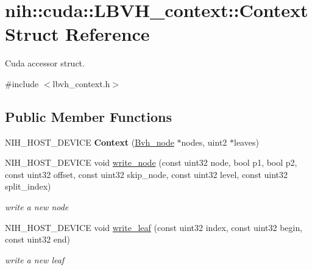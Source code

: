 \hypertarget{structnih_1_1cuda_1_1_l_b_v_h__context_1_1_context}{
\section{nih\-:\-:cuda\-:\-:\-L\-B\-V\-H\-\_\-context\-:\-:\-Context \-Struct \-Reference}
\label{structnih_1_1cuda_1_1_l_b_v_h__context_1_1_context}
}


\-Cuda accessor struct.  




{\ttfamily \#include $<$lbvh\-\_\-context.\-h$>$}

\subsection*{\-Public \-Member \-Functions}
\begin{DoxyCompactItemize}
\item 
\hypertarget{structnih_1_1cuda_1_1_l_b_v_h__context_1_1_context_a48c48237aa069100299b8b8f6d3e351e}{
\-N\-I\-H\-\_\-\-H\-O\-S\-T\-\_\-\-D\-E\-V\-I\-C\-E {\bfseries \-Context} (\hyperlink{structnih_1_1_bvh__node}{\-Bvh\-\_\-node} $\ast$nodes, uint2 $\ast$leaves)}
\label{structnih_1_1cuda_1_1_l_b_v_h__context_1_1_context_a48c48237aa069100299b8b8f6d3e351e}

\item 
\hypertarget{structnih_1_1cuda_1_1_l_b_v_h__context_1_1_context_acad326a954f197df7feba006a62d5c4c}{
\-N\-I\-H\-\_\-\-H\-O\-S\-T\-\_\-\-D\-E\-V\-I\-C\-E void \hyperlink{structnih_1_1cuda_1_1_l_b_v_h__context_1_1_context_acad326a954f197df7feba006a62d5c4c}{write\-\_\-node} (const uint32 node, bool p1, bool p2, const uint32 offset, const uint32 skip\-\_\-node, const uint32 level, const uint32 split\-\_\-index)}
\label{structnih_1_1cuda_1_1_l_b_v_h__context_1_1_context_acad326a954f197df7feba006a62d5c4c}

\begin{DoxyCompactList}\small\item\em write a new node \end{DoxyCompactList}\item 
\hypertarget{structnih_1_1cuda_1_1_l_b_v_h__context_1_1_context_a1a3568a9281f2af0787dfbb641f9b68e}{
\-N\-I\-H\-\_\-\-H\-O\-S\-T\-\_\-\-D\-E\-V\-I\-C\-E void \hyperlink{structnih_1_1cuda_1_1_l_b_v_h__context_1_1_context_a1a3568a9281f2af0787dfbb641f9b68e}{write\-\_\-leaf} (const uint32 index, const uint32 begin, const uint32 end)}
\label{structnih_1_1cuda_1_1_l_b_v_h__context_1_1_context_a1a3568a9281f2af0787dfbb641f9b68e}

\begin{DoxyCompactList}\small\item\em write a new leaf \end{DoxyCompactList}\end{DoxyCompactItemize}
